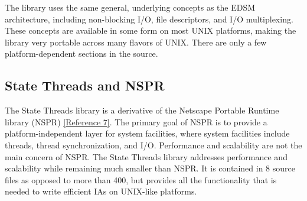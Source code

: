 \documentclass[a4paper,12pt,notitlepage,twoside,openright]{article}
\begin{document}
The library uses the same general, underlying concepts as the EDSM
architecture, including non-blocking I/O, file descriptors, and I/O
multiplexing. These concepts are available in some form on most UNIX
platforms, making the library very portable across many flavors of UNIX.
There are only a few platform-dependent sections in the source.

\hypertarget{state-threads-and-nspr}{%
\subsection{State Threads and NSPR}\label{state-threads-and-nspr}}

The State Threads library is a derivative of the Netscape Portable
Runtime library (NSPR) \protect\hyperlink{refs7}{{[}Reference 7{]}}. The
primary goal of NSPR is to provide a platform-independent layer for
system facilities, where system facilities include threads, thread
synchronization, and I/O. Performance and scalability are not the main
concern of NSPR. The State Threads library addresses performance and
scalability while remaining much smaller than NSPR. It is contained in 8
source files as opposed to more than 400, but provides all the
functionality that is needed to write efficient IAs on UNIX-like
platforms.
\end{document}
